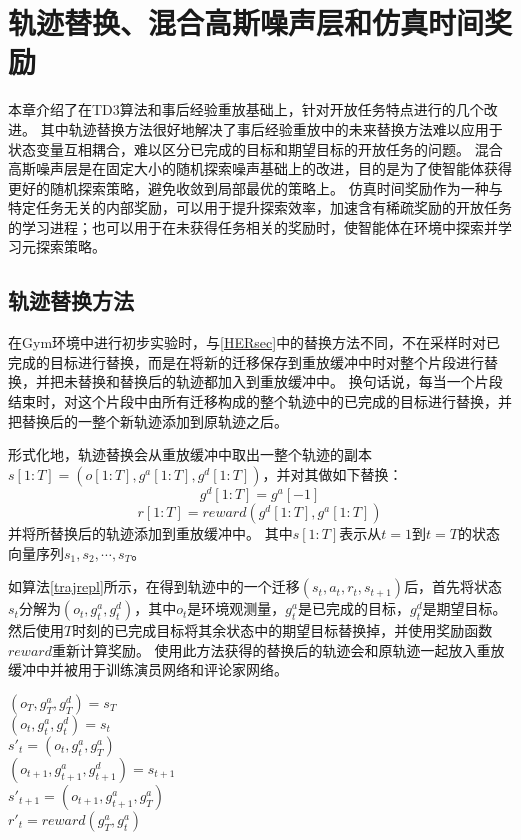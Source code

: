 \chapter{轨迹替换、混合高斯噪声层和仿真时间奖励}
本章介绍了在TD3算法和事后经验重放基础上，针对开放任务特点进行的几个改进。
其中轨迹替换方法很好地解决了事后经验重放中的未来替换方法难以应用于状态变量互相耦合，难以区分已完成的目标和期望目标的开放任务的问题。
混合高斯噪声层是在固定大小的随机探索噪声基础上的改进，目的是为了使智能体获得更好的随机探索策略，避免收敛到局部最优的策略上。
仿真时间奖励作为一种与特定任务无关的内部奖励，可以用于提升探索效率，加速含有稀疏奖励的开放任务的学习进程；也可以用于在未获得任务相关的奖励时，使智能体在环境中探索并学习元探索策略。
\section{轨迹替换方法}

在Gym环境中进行初步实验时，与\ref{HERsec}中的替换方法不同，不在采样时对已完成的目标进行替换，而是在将新的迁移保存到重放缓冲中时对整个片段进行替换，并把未替换和替换后的轨迹都加入到重放缓冲中。
换句话说，每当一个片段结束时，对这个片段中由所有迁移构成的整个轨迹中的已完成的目标进行替换，并把替换后的一整个新轨迹添加到原轨迹之后。

形式化地，轨迹替换会从重放缓冲中取出一整个轨迹的副本$s[1:T]=(o[1:T], g^a[1:T], g^d[1:T])$，并对其做如下替换：
$$g^d[1:T]=g^a[-1]$$
$$r[1:T]=reward(g^d[1:T], g^a[1:T])$$
并将所替换后的轨迹添加到重放缓冲中。
其中$s[1:T]$表示从$t=1$到$t=T$的状态向量序列$s_1, s_2, \cdots, s_T$。

如算法\ref{trajrepl}所示，在得到轨迹中的一个迁移$(s_t,a_t,r_t,s_{t+1})$后，首先将状态$s_t$分解为$(o_t, g^a_t,g^d_t)$，其中$o_t$是环境观测量，$g^a_t$是已完成的目标，$g^d_t$是期望目标。
然后使用$T$时刻的已完成目标将其余状态中的期望目标替换掉，并使用奖励函数$reward$重新计算奖励。
使用此方法获得的替换后的轨迹会和原轨迹一起放入重放缓冲中并被用于训练演员网络和评论家网络。
\begin{algorithm}

$(o_T, g^a_T, g^d_T) = s_T$\\
{
    $(o_t, g^a_t, g^d_t) = s_t$\\
    $s'_t=(o_t, g^a_t, g^a_T)$\\
    $(o_{t+1}, g^a_{t+1}, g^d_{t+1}) = s_{t+1}$\\
    $s'_{t+1}=(o_{t+1}, g^a_{t+1}, g^a_T)$\\
    $r'_t=reward(g^a_T, g^a_t)$
 }
    
\end{algorithm}

